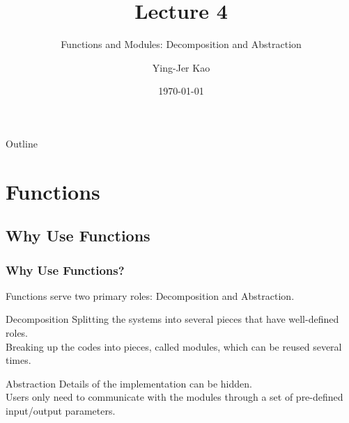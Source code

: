 \documentclass{beamer}
\title[Functions and Modules] %
{Lecture 4}
\subtitle
{Functions and Modules: Decomposition and Abstraction} %
\author[Ying-Jer Kao] %
{Ying-Jer Kao}
\institute[National Taiwan University] %
{
  Department of Physics\\
 National Taiwan University
  }
\date[Numerical Analysis and Programming] %
{\today}
\begin{document}
\begin{frame}
  \titlepage
\end{frame}

\begin{frame}{Outline}
  \tableofcontents
\end{frame}




\section{Functions}
\subsection[Why Use Functions]{Why Use Functions}


\begin{frame}[fragile]
\frametitle{Why Use Functions?}
Functions serve two primary roles: \alert{Decomposition} and \alert{Abstraction}.
\begin{block}{Decomposition}
 Splitting the systems into several pieces that have well-defined roles.\\
  Breaking up the codes into pieces, called \alert{modules}, which can be reused several times. 
  \end{block}
  
\begin{block}{Abstraction}
Details of the implementation can be hidden.\\
 Users only need to communicate with the modules through a set of pre-defined input/output \alert{parameters}.
\end{block}
\end{frame}
\end{document}
